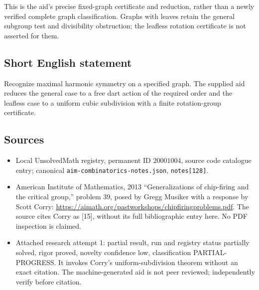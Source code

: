 \documentclass[11pt]{article}
\begin{document}
This is the aid's precise fixed-graph certificate and reduction, rather than a newly verified complete graph classification. Graphs with leaves retain the general subgroup test and divisibility obstruction; the leafless rotation certificate is not asserted for them.
\subsection{Short English statement}
Recognize maximal harmonic symmetry on a specified graph. The supplied aid reduces the general case to a free dart action of the required order and the leafless case to a uniform cubic subdivision with a finite rotation-group certificate.
\subsection{Sources}
\begin{itemize}
\item Local UnsolvedMath registry, permanent ID $20001004$, source code catalogue entry; canonical \texttt{aim-combinatorics-notes.json}, \texttt{notes[128]}.
\item American Institute of Mathematics, 2013 ``Generalizations of chip-firing and the critical group,'' problem 39, posed by Gregg Musiker with a response by Scott Corry: \url{https://aimath.org/pastworkshops/chipfiringproblems.pdf}. The source cites Corry as [15], without its full bibliographic entry here. No PDF inspection is claimed.
\item Attached research attempt 1: partial result, run and registry status partially solved, rigor proved, novelty confidence low, classification PARTIAL-PROGRESS. It invokes Corry's uniform-subdivision theorem without an exact citation. The machine-generated aid is not peer reviewed; independently verify before citation.
\end{itemize}
\end{document}
